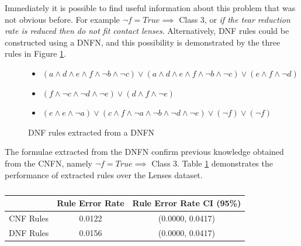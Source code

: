 \noindent
\begin{minipage}[t]{0.45\textwidth}
Immediately it is possible to find useful information about this problem that was not obvious before. For example $\lnot f = True \implies $ Class 3, or \textit{if the tear reduction rate is reduced then do not fit contact lenses}. Alternatively, DNF rules could be constructed using a DNFN, and this possibility is demonstrated by the three rules in Figure \ref{fig:lenses-dnfn-rules}.\\
\end{minipage}
\hspace{0.05\textwidth}
\begin{minipage}[t]{0.5\textwidth}
\begin{figure}[H]
\begin{itemize}
	\item {} $(a \land d \land e \land f \land \lnot b \land \lnot c) \lor (a \land d \land e \land f \land \lnot b \land \lnot c) \lor (e \land f \land \lnot d)$
	\item {} $(f \land \lnot c \land \lnot d \land \lnot e) \lor (d \land f \land \lnot e)$
	\item {} $(e \land e \land \lnot a) \lor (c \land f \land \lnot a \land \lnot b \land \lnot d \land \lnot e) \lor (\lnot f) \lor (\lnot f)$
\end{itemize}
\caption{DNF rules extracted from a DNFN}
\label{fig:lenses-dnfn-rules}
\end{figure}
\end{minipage}

\noindent
\begin{minipage}[t]{0.32\textwidth}
The formulae extracted from the DNFN confirm previous knowledge obtained from the CNFN, namely $\lnot f = True \implies $ Class 3. Table \ref{tab:lenses-rule-peformance-comp} demonstrates the performance of extracted rules over the Lenses dataset.\\
\end{minipage}
\hspace{0.05\textwidth}
\begin{minipage}[t]{0.63\textwidth}
\begin{table}[H]
	\begin{center}
		\begin{tabular}{| c | c | c |}
			\hline
			& Rule Error Rate & Rule Error Rate CI (95\%) \\
			\hline
			\hline
			CNF Rules & 0.0122 & (0.0000, 0.0417) \\
			\hline
			DNF Rules & 0.0156 & (0.0000, 0.0417) \\
			\hline
		\end{tabular}
	\end{center}
	\caption{}
	\label{tab:lenses-rule-peformance-comp}
\end{table}
\end{minipage}

